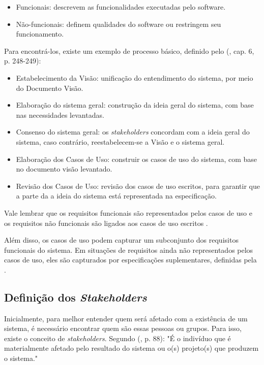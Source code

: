 \begin{itemize}
    \item Funcionais: descrevem as funcionalidades executadas pelo software.
    \item Não-funcionais: definem qualidades do software ou restringem seu funcionamento.
\end{itemize}

Para encontrá-los, existe um exemplo de processo básico, definido pelo  (\citeyear{kurtbittnerianspence2002}, cap. 6, p. 248-249):

\begin{itemize}
    \item Estabelecimento da Visão: unificação do entendimento do sistema, por meio do Documento Visão.
    \item Elaboração do sistema geral: construção da ideia geral do sistema, com base nas necessidades levantadas.
    \item Consenso do sistema geral: os \textit{stakeholders} concordam com a ideia geral do sistema, caso contrário, reestabelecem-se a Visão e o sistema geral.
    \item Elaboração dos Casos de Uso: construir os casos de uso do sistema, com base no documento visão levantado.
    \item Revisão dos Casos de Uso: revisão dos casos de uso escritos, para garantir que a parte da a ideia do sistema está representada na especificação.
\end{itemize}

Vale lembrar que os requisitos funcionais são representados pelos casos de uso e os requisitos não funcionais são ligados aos casos de uso escritos \cite{kurtbittnerianspence2002}.

Além disso, os casos de uso podem capturar um subconjunto dos requisitos funcionais do sistema. Em situações de requisitos ainda não representados pelos casos de uso, eles são capturados por especificações suplementares, definidas pela \citeauthor{ibm2011} \cite{kurtbittnerianspence2002}.

\subsection{Definição dos \textit{Stakeholders}}
Inicialmente, para melhor entender quem será afetado com a existência de um sistema, é necessário encontrar quem são essas pessoas ou grupos. Para isso, existe o conceito de \textit{stakeholders}. Segundo  (\citeyear{kurtbittnerianspence2002}, p. 88): "É o indivíduo que é materialmente afetado pelo resultado do sistema ou o(s) projeto(s) que produzem o sistema."

